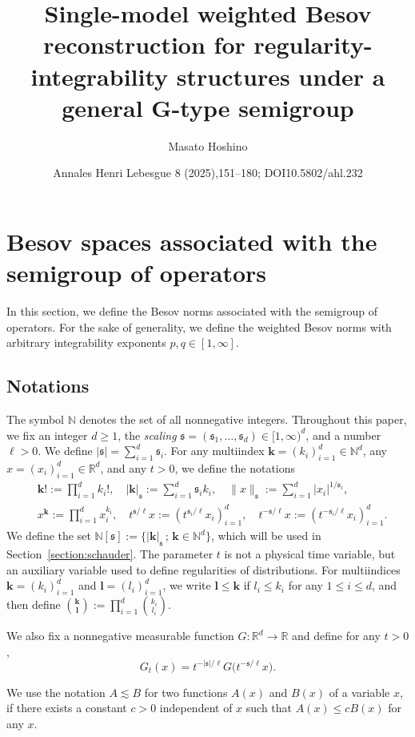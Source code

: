 \documentclass[10pt]{amsart}
\title[Single-model weighted Besov reconstruction]{Single-model weighted Besov reconstruction for regularity-integrability structures under a general G-type semigroup}
\author{Masato Hoshino}
\date{Annales Henri Lebesgue 8 (2025),151–180; DOI10.5802/ahl.232}
\theoremstyle{definition}
\numberwithin{equation}{section}
\newcommand{\bbR}{\mathbb{R}}
\newcommand{\bbN}{\mathbb{N}}
\newcommand{\mfs}{\mathfrak{s}}
\newcommand{\bfk}{\mathbf{k}}
\newcommand{\bfl}{\mathbf{l}}
\begin{document}
\maketitle
\setcounter{section}{1}
\section{Besov spaces associated with the semigroup of operators}\label{section:semigroup}

In this section, we define the Besov norms associated with the semigroup of operators. For the sake of generality, we define the weighted Besov norms with arbitrary integrability exponents $p,q\in[1,\infty]$.

\subsection{Notations}\label{subsection:notation}

The symbol $\bbN$ denotes the set of all nonnegative integers. Throughout this paper, we fix an integer $d\ge1$, the \emph{scaling} $\mfs=(\mfs_1,\dots,\mfs_d)\in[1,\infty)^d$, and a number $\ell>0$. We define $|\mfs|=\sum_{i=1}^d\mfs_i$. For any multiindex ${\bfk}=(k_i)_{i=1}^d\in\bbN^d$, any $x=(x_i)_{i=1}^d\in\bbR^d$, and any $t>0$, we define the notations
\begin{align*}
&{\bfk}!:=\prod_{i=1}^dk_i!,\quad |{\bfk}|_{\mfs}:=\sum_{i=1}^d\mfs_ik_i,\quad
\|x\|_\mfs:=\sum_{i=1}^d|x_i|^{1/\mfs_i},\\
&x^{\bfk}:=\prod_{i=1}^dx_i^{k_i},\quad t^{\mfs/\ell}x:=\left(t^{\mfs_i/\ell}x_i\right)_{i=1}^d,\quad t^{-\mfs/\ell}x:=\left(t^{-\mfs_i/\ell}x_i\right)_{i=1}^d.
\end{align*}
We define the set $\bbN[\mfs]:=\{|{\bfk}|_\mfs\,;\,{\bfk}\in\bbN^d\}$, which will be used in Section~\ref{section:schauder}. The parameter $t$ is not a physical time variable, but an auxiliary variable used to define regularities of distributions. For multiindices ${\bfk}=(k_i)_{i=1}^d$ and ${\bfl}=(l_i)_{i=1}^d$, we write ${\bfl}\le{\bfk}$ if $l_i\le k_i$ for any $1\le i\le d$, and then define $\binom{{\bfk}}{{\bfl}}:=\prod_{i=1}^d\binom{k_i}{l_i}$.

We also fix a nonnegative measurable function $G:\bbR^d\to\bbR$ and define for any $t>0$,
\[
G_t(x)=t^{-|\mfs|/\ell}G\big(t^{-\mfs/\ell}x\big).
\]

We use the notation $A\lesssim B$ for two functions $A(x)$ and $B(x)$ of a variable $x$, if there exists a constant $c>0$ independent of $x$ such that $A(x)\le cB(x)$ for any $x$.
\end{document}
